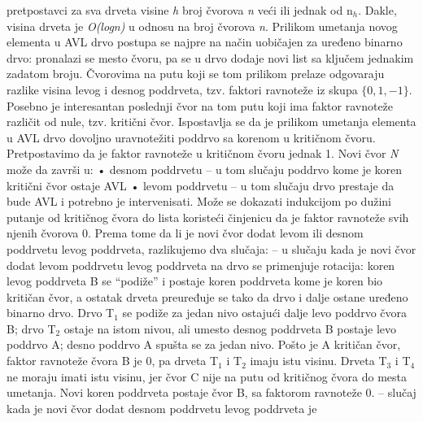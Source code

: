 \documentclass{article}
\begin{document}
pretpostavci za sva drveta visine \textit{h} broj čvorova \textit{n} veći ili jednak od n$_h$.
Dakle, visina drveta je \textit{O(logn)} u odnosu na broj čvorova \textit{n}.
\newline Prilikom umetanja novog elementa u AVL drvo postupa se najpre na način
uobičajen za uređeno binarno drvo: pronalazi se mesto čvoru, pa se u drvo
dodaje novi list sa ključem jednakim zadatom broju. Čvorovima na putu koji
se tom prilikom prelaze odgovaraju razlike visina levog i desnog poddrveta, tzv.
faktori ravnoteže iz skupa $\{0, 1, -1\}$. Posebno je interesantan poslednji čvor na
tom putu koji ima faktor ravnoteže različit od nule, tzv. kritični čvor. Ispostavlja
se da je prilikom umetanja elementa u AVL drvo dovoljno uravnotežiti poddrvo
sa korenom u kritičnom čvoru.
\newline
Pretpostavimo da je faktor ravnoteže u kritičnom čvoru jednak 1. Novi čvor \textit{N} može da završi u:
\newline \hspace*{0.4cm}• desnom poddrvetu – u tom slučaju poddrvo kome je koren kritični čvor ostaje AVL
\newline \hspace*{0.4cm}• levom poddrvetu – u tom slučaju drvo prestaje da bude AVL i potrebno
je intervenisati. Može se dokazati indukcijom po dužini putanje od kritičnog čvora do lista koristeći
činjenicu da je faktor ravnoteže svih njenih čvorova 0. Prema tome da li je novi čvor dodat levom ili desnom poddrvetu levog poddrveta, razlikujemo
dva slučaja:
\newline \hspace*{0.8cm}– u slučaju kada je novi čvor dodat levom poddrvetu levog poddrveta
na drvo se primenjuje rotacija: koren levog
poddrveta B se “podiže” i postaje koren poddrveta kome je koren
bio kritičan čvor, a ostatak drveta preuređuje se tako da drvo i dalje
ostane uređeno binarno drvo. Drvo T$_1$ se podiže za jedan nivo ostajući dalje levo poddrvo čvora B; drvo T$_2$ ostaje na istom nivou, ali umesto
desnog poddrveta B postaje levo poddrvo A; desno poddrvo A spušta
se za jedan nivo. Pošto je A kritičan čvor, faktor ravnoteže čvora B je 0, pa drveta T$_1$ i T$_2$ imaju istu visinu. Drveta T$_3$ i T$_4$ ne moraju
imati istu visinu, jer čvor C nije na putu od kritičnog čvora do
mesta umetanja. Novi koren poddrveta postaje čvor B, sa faktorom
ravnoteže 0.
\newline \hspace*{0.8cm}– slučaj kada je novi čvor dodat desnom poddrvetu levog poddrveta je
\end{document}

